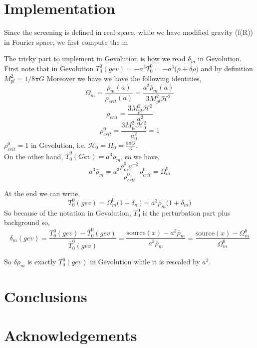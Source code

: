 \documentclass[a4paper,10pt]{article}
\def\be{\begin{equation}}
\def\ee{\end{equation}}
\newcommand{\HH}{\mathcal H}
\begin{document}
\section{Implementation}
Since the screening is defined in real space, while we have modified gravity (f(R)) in Fourier space, we first compute the m

The tricky part to implement in Gevolution is how we read $\delta_m$ in Gevolution. \\
 First note that in  Gevolution $T_0^0 (gev)=-a^3 T_0^0 = -a^3 \big(\bar{\rho} + \delta \rho \big) $ and by definition $ M^2_{pl}= 1/8 \pi G$
Moreover we have we have the following identities,
\be
\Omega_m= \frac{\rho_m(a)}{\rho_{crit} (a)} = \frac{a^2 \bar{\rho}_m(a)}{3 M_{pl}^2 \HH^2}
\ee
\be
\rho_{crit} = \frac{3 M_{pl}^2 \HH^2}{a^2}
\ee
\be
\rho_{crit} ^0= \frac{3 M_{pl}^2 \HH_0^2}{a_0^2}=1
\ee
$\rho^{0}_{crit}=1$ in Gevolution,  i.e. $\HH_0 =H_0 = \frac {8 \pi G}{3} $.\\
On the other hand, $\bar{T}_0^0(Gev) = a^3 \bar{\rho}_m$, so we have,
\be
a^3 \bar{\rho}_m = a^3   \frac{\bar{\rho}_m^0 a^{-3} }{\rho_{crit}^0} {\rho_{crit}^0} = \Omega_m^0
\ee

At the end we can write,
\be
T_0^0 (gev) = \Omega_m^0 \Big( 1+ \delta_m \Big) = a^3 \bar{\rho}_m \big(1+ \delta_m \big)
\ee
So because of the notation in Gevolution, $T_0^0$ is  the perturbation part plus background so,
\be
\delta_m(gev) = \frac{ T_0^0 (gev)  - \bar{T}_0^0 (gev) }{ \bar{T}_0^0 (gev)} = \frac{\text{source}(x) -a^3 \bar{\rho}_m }{ a^3 \bar{\rho}_m } = \frac{\text{source}(x)- \Omega_m^0}{ \Omega_m^0}
\ee

So  $\delta \rho_m$ is exactly $T_0^0 (gev)$ in Gevolution while it is rescaled by $a^3$. 
\section{Conclusions}

\setcounter{equation}{0}

 
\section*{Acknowledgements}
\end{document}
